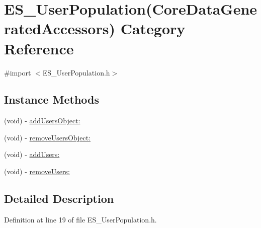 \hypertarget{category_e_s___user_population_07_core_data_generated_accessors_08}{\section{E\+S\+\_\+\+User\+Population(Core\+Data\+Generated\+Accessors) Category Reference}
\label{category_e_s___user_population_07_core_data_generated_accessors_08}
}


{\ttfamily \#import $<$E\+S\+\_\+\+User\+Population.\+h$>$}

\subsection*{Instance Methods}
\begin{DoxyCompactItemize}
\item 
(void) -\/ \hyperlink{category_e_s___user_population_07_core_data_generated_accessors_08_a3508b9a16ad4d4f5d2ae703b6570d23f}{add\+Users\+Object\+:}
\item 
(void) -\/ \hyperlink{category_e_s___user_population_07_core_data_generated_accessors_08_a808cd45860f246d072192bf626eca251}{remove\+Users\+Object\+:}
\item 
(void) -\/ \hyperlink{category_e_s___user_population_07_core_data_generated_accessors_08_a490ae6344ae338393457ced9f374bdc1}{add\+Users\+:}
\item 
(void) -\/ \hyperlink{category_e_s___user_population_07_core_data_generated_accessors_08_a7a2ce5d70bc19fc088cbff00174500c7}{remove\+Users\+:}
\end{DoxyCompactItemize}


\subsection{Detailed Description}


Definition at line 19 of file E\+S\+\_\+\+User\+Population.\+h.



